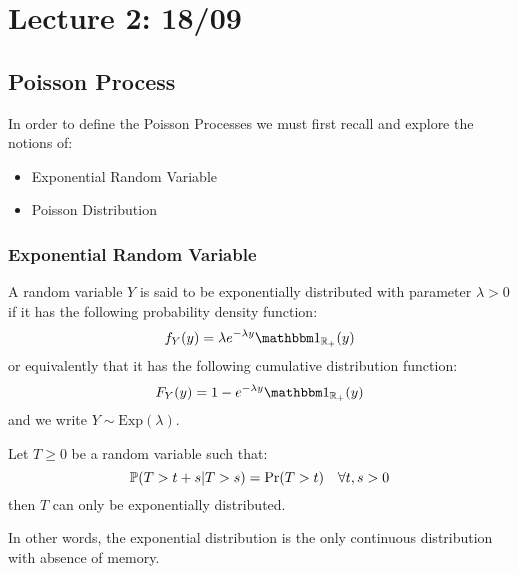 \chapter{Lecture 2: 18/09}

\section{Poisson Process}
In order to define the Poisson Processes we must first recall and explore the
notions of:
\begin{itemize}
    \item Exponential Random Variable
    \item Poisson Distribution
\end{itemize}

\subsection{Exponential Random Variable}
A random variable $Y$ is said to be exponentially distributed with parameter
$\lambda > 0$ if it has the following probability density function:
\[
    f_Y(y) = \lambda e^{-\lambda y} \I_{\Rpos}(y)
\]
or equivalently that it has the following cumulative distribution function:
\[
    F_Y(y) = 1 - e^{-\lambda y} \I_{\Rpos}(y)
\]
and we write $Y \sim \text{Exp}(\lambda)$.

\begin{theorem}
Let $T\geq0$ be a random variable such that:
\[ \P(T>t+s|T>s) = \Pr(T>t) \quad \forall t,s > 0 \]
then $T$ can only be exponentially distributed.
\end{theorem}

In other words, the exponential distribution is the only continuous distribution
with absence of memory.

